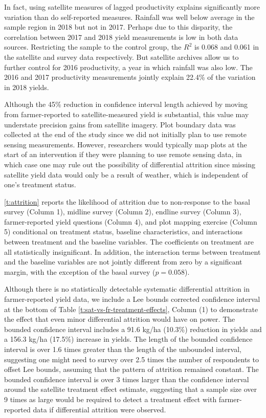 \documentclass{article}
\begin{document}
In fact, using satellite measures of lagged productivity explains significantly more variation than do self-reported measures. Rainfall was well below average in the sample region in 2018 but not in 2017. Perhaps due to this disparity, the correlation between 2017 and 2018 yield measurements is low in both data sources. Restricting the sample to the control group, the $R^2$ is 0.068 and 0.061 in the satellite and survey data respectively. But satellite archives allow us to further control for 2016 productivity, a year in which rainfall was also low. The 2016 and 2017 productivity measurements jointly explain 22.4\% of the variation in 2018 yields.

Although the 45\% reduction in confidence interval length achieved by moving from farmer-reported to satellite-measured yield is substantial, this value may understate precision gains from satellite imagery. Plot boundary data was collected at the end of the study since we did not initially plan to use remote sensing measurements. However, researchers would typically map plots at the start of an intervention if they were planning to use remote sensing data, in which case one may rule out the possibility of differential attrition since missing satellite yield data would only be a result of weather, which is independent of one’s treatment status. 

\ref{t:attrition} reports the likelihood of attrition due to non-response to the basal survey (Column 1), midline survey (Column 2), endline survey (Column 3), farmer-reported yield questions (Column 4), and plot mapping exercise (Column 5) conditional on treatment status, baseline characteristics, and interactions between treatment and the baseline variables. The coefficients on treatment are all statistically insignificant. In addition, the interaction terms between treatment and the baseline variables are not jointly different from zero by a significant margin, with the exception of the basal survey ($p=0.058$). 

Although there is no statistically detectable systematic differential attrition in farmer-reported yield data, we include a Lee bounds corrected confidence interval at the bottom of Table \ref{t:sat-vs-fr-treatment-effects}, Column (1) to demonstrate the effect that even minor differential attrition would have on power. The bounded confidence interval includes a 91.6 kg/ha (10.3\%) reduction in yields and a 156.3 kg/ha (17.5\%) increase in yields. The length of the bounded confidence interval is over 1.6 times greater than the length of the unbounded interval, suggesting one might need to survey over 2.5 times the number of respondents to offset Lee bounds, assuming that the pattern of attrition remained constant. The bounded confidence interval is over 3 times larger than the confidence interval around the satellite treatment effect estimate, suggesting that a sample size over 9 times as large would be required to detect a treatment effect with farmer-reported data if differential attrition were observed. 
\end{document}
